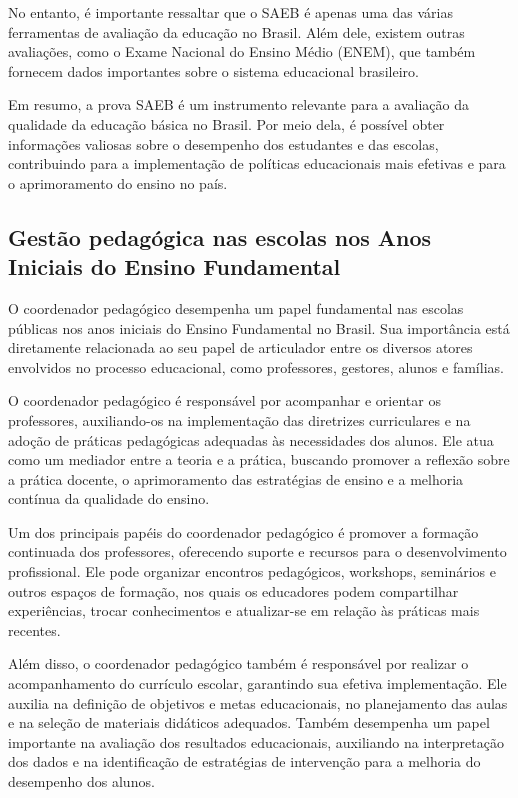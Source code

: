 No entanto, é importante ressaltar que o SAEB é apenas uma das várias
ferramentas de avaliação da educação no Brasil. Além dele, existem
outras avaliações, como o Exame Nacional do Ensino Médio (ENEM), que
também fornecem dados importantes sobre o sistema educacional
brasileiro.

Em resumo, a prova SAEB é um instrumento relevante para a avaliação da
qualidade da educação básica no Brasil. Por meio dela, é possível obter
informações valiosas sobre o desempenho dos estudantes e das escolas,
contribuindo para a implementação de políticas educacionais mais
efetivas e para o aprimoramento do ensino no país.

\subsection{Gestão pedagógica nas escolas nos Anos Iniciais do Ensino
Fundamental}\label{gestuxe3o-pedaguxf3gica-nas-escolas-nos-anos-iniciais-do-ensino-fundamental}

O coordenador pedagógico desempenha um papel fundamental nas escolas
públicas nos anos iniciais do Ensino Fundamental no Brasil. Sua
importância está diretamente relacionada ao seu papel de articulador
entre os diversos atores envolvidos no processo educacional, como
professores, gestores, alunos e famílias.

O coordenador pedagógico é responsável por acompanhar e orientar os
professores, auxiliando-os na implementação das diretrizes curriculares
e na adoção de práticas pedagógicas adequadas às necessidades dos
alunos. Ele atua como um mediador entre a teoria e a prática, buscando
promover a reflexão sobre a prática docente, o aprimoramento das
estratégias de ensino e a melhoria contínua da qualidade do ensino.

Um dos principais papéis do coordenador pedagógico é promover a formação
continuada dos professores, oferecendo suporte e recursos para o
desenvolvimento profissional. Ele pode organizar encontros pedagógicos,
workshops, seminários e outros espaços de formação, nos quais os
educadores podem compartilhar experiências, trocar conhecimentos e
atualizar-se em relação às práticas mais recentes.

Além disso, o coordenador pedagógico também é responsável por realizar o
acompanhamento do currículo escolar, garantindo sua efetiva
implementação. Ele auxilia na definição de objetivos e metas
educacionais, no planejamento das aulas e na seleção de materiais
didáticos adequados. Também desempenha um papel importante na avaliação
dos resultados educacionais, auxiliando na interpretação dos dados e na
identificação de estratégias de intervenção para a melhoria do
desempenho dos alunos.

